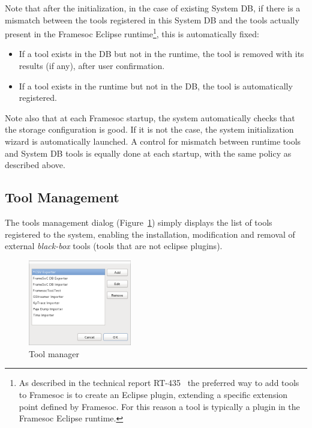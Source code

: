 \documentclass[twoside]{article}
\begin{document}
\begin{sloppypar}
Note that after the initialization, in the case of existing System DB, if there is a mismatch between the tools registered in this System DB and the tools actually present in the Framesoc Eclipse runtime\footnote{As described in the technical report RT-435~\cite{pagano:hal-00830008} the preferred way to add tools to Framesoc is to create an Eclipse plugin, extending a specific extension point defined by Framesoc. For this reason a tool is typically a plugin in the Framesoc Eclipse runtime.}, this is automatically fixed:
\begin{itemize}
 \item If a tool exists in the DB but not in the runtime, the tool is removed with its results (if any), after user confirmation.
 \item If a tool exists in the runtime but not in the DB, the tool is automatically registered.
\end{itemize}
Note also that at each Framesoc startup, the system automatically checks that the storage configuration is good. 
If it is not the case, the system initialization wizard is automatically launched.
A control for mismatch between runtime tools and System DB tools is equally done at each startup, with the same policy as described above.

\subsection{Tool Management}
\label{subsec:tools}


The tools management dialog (Figure~\ref{fig:manage_tools}) simply displays the list of tools registered to the system, 
enabling the installation, modification and removal of external \emph{black-box} tools (tools that are not eclipse plugins).

\begin{figure}[h!]
  \centering
    \includegraphics[width=0.4\textwidth]{images/manage_tools.png}
  \caption{Tool manager}
  \label{fig:manage_tools}
\end{figure}


\end{sloppypar}
\end{document}
